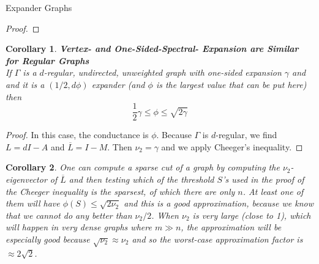 \documentclass{article}
\newtheorem{cor}{Corollary}
\begin{document}
\begin{section}{Expander Graphs}
\begin{proof}
   \end{proof}
   \begin{cor}{\textbf{Vertex- and One-Sided-Spectral- Expansion are Similar for Regular Graphs}\\}
     If $\Gamma$ is a $d$-regular, undirected, unweighted graph with one-sided expansion $\gamma$ and and it is a $(1/2,d\phi)$ expander (and $\phi$ is the largest value that can be put here) then 
     $$
     \frac{1}{2}\gamma \leq \phi \leq \sqrt{2\gamma}
     $$
   \end{cor}
   \begin{proof}
     In this case, the conductance is $\phi$.
     Because $\Gamma$ is $d$-regular, we find $L = dI - A$ and $\overline L = I - M$.
     Then $\nu_2 = \gamma$ and we apply Cheeger's inequality. 
   \end{proof}
   \begin{cor}
     One can compute a sparse cut of a graph by computing the $\nu_2$-eigenvector of $\overline L$ and then testing which of the threshold $S$'s used in the proof of the Cheeger inequality is the sparsest, of which there are only $n$.
     At least one of them will have $\phi(S) \leq \sqrt{2\nu_2}$ and this is a good approximation, because we know that we cannot do any better than $\nu_2/2$.
     When $\nu_2$ is very large (close to 1), which will happen in very dense graphs where $m \gg n$, the approximation will be especially good because $\sqrt{\nu_2} \approx \nu_2$ and so the worst-case approximation factor is $\approx 2\sqrt{2}$.
   \end{cor}


\end{section}
\end{document}
